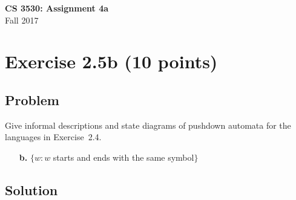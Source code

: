 \documentclass{article}
\begin{document}
\begin{empfile}

\begin{center}
\textbf{\Large CS 3530: Assignment 4a} \\[2mm]
Fall 2017
\end{center}

\raggedright

\section*{Exercise 2.5b (10 points)}

\subsection*{Problem}

Give informal descriptions and state diagrams of pushdown automata
for the languages in Exercise~2.4.

\begin{enumerate}
\item[\textbf{b.}] $\{w:w$ starts and ends with the same symbol$\}$
\end{enumerate}

\subsection*{Solution}


\end{empfile}
\end{document}
